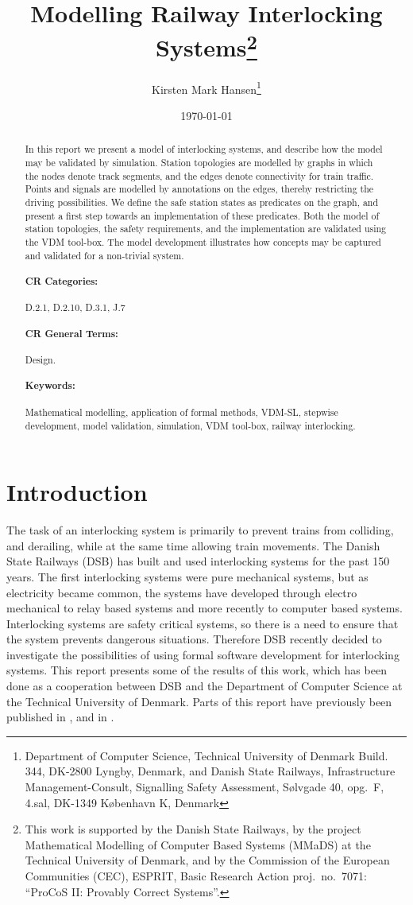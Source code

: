 \documentclass[11pt]{article}
\title{Modelling Railway Interlocking Systems\thanks{This work is supported by the
    Danish State Railways, by the project Mathematical
    Modelling of Computer Based Systems (MMaDS) at the Technical University of
    Denmark, and by the Commission of the European Communities (CEC),
    ESPRIT, Basic Research Action
    proj.\ no.\ 7071: ``ProCoS II: Provably Correct Systems''.}}
\author{Kirsten Mark Hansen\thanks{Department of Computer Science, Technical University
of Denmark Build. 344, DK-2800 Lyngby, Denmark, and
Danish State Railways, Infrastructure Management-Consult, Signalling
Safety Assessment, 
S\o lvgade 40, opg.\ F, 4.sal, DK-1349 K\o benhavn K, Denmark}}
\date{\today}
\begin{document}
\maketitle

\begin{abstract}
In this report we present a model of interlocking systems, and
describe how the model may be validated by simulation. Station
topologies are modelled by graphs in which the nodes denote track
segments, and the edges denote connectivity for train traffic. Points
and signals are modelled by annotations on the edges, thereby
restricting the driving possibilities. We define the safe station
states as predicates on the graph, and present a first step towards an
implementation of
these predicates. Both the model of station topologies, the safety
requirements, and the implementation are
validated using the VDM tool-box. The model development
illustrates how concepts may be captured and validated for a
non-trivial system.

\paragraph{CR Categories:} D.2.1, D.2.10, D.3.1, J.7
\paragraph{CR General Terms:} Design. 
\paragraph{Keywords:} Mathematical modelling, application of formal
methods, VDM-SL, stepwise
development, model validation, simulation, VDM tool-box, 
railway interlocking.
\end{abstract}


\section{Introduction}

The task of an
interlocking system is primarily to prevent trains from colliding, and
derailing, while at the same time allowing train movements. The Danish State
Railways
(DSB) has built and used interlocking systems for the past 150 years. The first
interlocking systems were pure mechanical systems, but as electricity became
common, the systems have developed through
electro mechanical to relay based systems and more recently to
computer based systems. Interlocking systems are safety
critical systems, so there is a need to ensure that the system prevents
dangerous
situations. Therefore DSB recently
decided to investigate the possibilities of using
formal software development for interlocking systems. This report presents
some of the
results of this work, which has been done as a cooperation between DSB and
the Department of Computer Science at the Technical University of
Denmark. Parts of this report have previously been published
in \cite{nsdcs94}, and in  \cite{fme94}.
\end{document}

